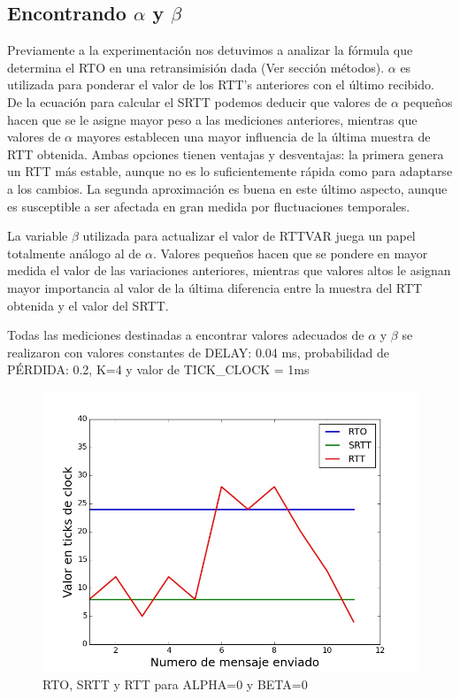 \subsection{Encontrando $\alpha$ y $\beta$}

Previamente a la experimentación nos detuvimos a analizar la fórmula que determina el RTO en una
retransimisión dada (Ver sección métodos).
$\alpha$ es utilizada para ponderar el valor de los RTT's anteriores con el último recibido.
De la ecuación para calcular el SRTT podemos deducir que valores de $\alpha$ peque\~nos hacen que
se le asigne mayor peso a las mediciones anteriores, mientras que valores de $\alpha$ mayores
establecen una mayor influencia de la última muestra de RTT obtenida.
Ambas opciones tienen ventajas y desventajas: la primera genera un RTT más estable, aunque no es
lo suficientemente rápida como para adaptarse a los cambios. La segunda aproximación es buena en
este último aspecto, aunque es susceptible a ser afectada en gran medida por fluctuaciones
temporales.

La variable $\beta$ utilizada para actualizar el valor de RTTVAR
juega un papel totalmente análogo al de $\alpha$. Valores peque\~nos hacen que se pondere en
mayor medida el valor de las variaciones anteriores, mientras que valores altos le asignan
mayor importancia al valor de la última diferencia entre la muestra del RTT obtenida y el valor
del SRTT.

Todas las mediciones destinadas a encontrar valores adecuados de $\alpha$ y $\beta$ se realizaron
con valores constantes de DELAY: 0.04 ms, probabilidad de PÉRDIDA: 0.2, K=4 y valor de
TICK\_CLOCK = 1ms

\begin{figure}[H]
  \begin{center}
      \includegraphics[scale=0.32]{imagenes/ALPHA_0_BETA_0.jpg}
      \caption{RTO, SRTT y RTT para ALPHA=0 y BETA=0}
  \end{center}
\end{figure}

